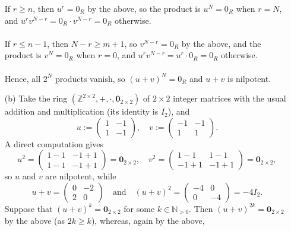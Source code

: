 \begin{solution}
\begin{enumerate}
            If \( r \geq n \), then \( u^{r} = 0_R \) by the above, so the product is \( u^{N} = 0_R \) when \( r = N \), and \( u^{r} v^{N-r} = 0_R \cdot v^{N-r} = 0_R \) otherwise.
            \\\\
            If \( r \leq n - 1 \), then \( N - r \geq m + 1 \), so \( v^{N-r} = 0_R \) by the above, and the product is \( v^{N} = 0_R \) when \( r = 0 \), and \( u^{r} v^{N-r} = u^{r} \cdot 0_R = 0_R \) otherwise.
            \\\\
            Hence, all \( 2^{N} \) products vanish, so \( \left(u + v\right)^{N} = 0_R \) and \( u + v \) is nilpotent.

        \item[(b)] Take the ring \( \left(\mathbb{Z}^{2 \times 2}, +, \cdot, \mathbf{0}_{2 \times 2}\right) \) of \( 2 \times 2 \) integer matrices with the usual addition and multiplication (its identity is \( I_{2} \)), and
            \[
                u := \begin{pmatrix} 1 & -1 \\ 1 & -1 \end{pmatrix}, \quad v := \begin{pmatrix} -1 & -1 \\ 1 & 1 \end{pmatrix}.
            \]
            A direct computation gives
            \[
                u^{2} = \begin{pmatrix} 1 - 1 & -1 + 1 \\ 1 - 1 & -1 + 1 \end{pmatrix} = \mathbf{0}_{2 \times 2}, \quad v^{2} = \begin{pmatrix} 1 - 1 & 1 - 1 \\ -1 + 1 & -1 + 1 \end{pmatrix} = \mathbf{0}_{2 \times 2},
            \]
            so \( u \) and \( v \) are nilpotent, while
            \[
                u + v = \begin{pmatrix} 0 & -2 \\ 2 & 0 \end{pmatrix} \quad \text{and} \quad \left(u + v\right)^{2} = \begin{pmatrix} -4 & 0 \\ 0 & -4 \end{pmatrix} = -4 I_{2}.
            \]
            Suppose that \( \left(u + v\right)^{k} = \mathbf{0}_{2 \times 2} \) for some \( k \in \mathbb{N}_{>0} \). Then \( \left(u + v\right)^{2k} = \mathbf{0}_{2 \times 2} \) by the above (as \( 2k \geq k \)), whereas, again by the above,

\end{enumerate}
\end{solution}
